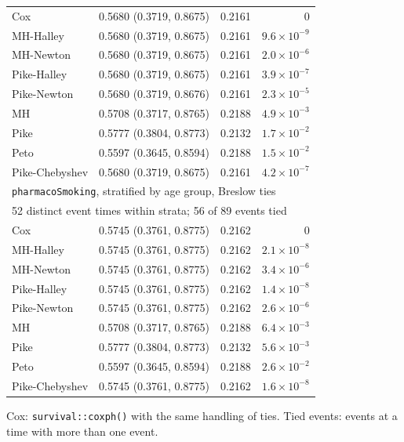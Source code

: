 \begin{longtable}{llrr}
Cox & 0.5680 (0.3719, 0.8675) & 0.2161 & $0$ \\
MH-Halley & 0.5680 (0.3719, 0.8675) & 0.2161 & $9.6 \times 10^{-9}$ \\
MH-Newton & 0.5680 (0.3719, 0.8675) & 0.2161 & $2.0 \times 10^{-6}$ \\
Pike-Halley & 0.5680 (0.3719, 0.8675) & 0.2161 & $3.9 \times 10^{-7}$ \\
Pike-Newton & 0.5680 (0.3719, 0.8676) & 0.2161 & $2.3 \times 10^{-5}$ \\
MH & 0.5708 (0.3717, 0.8765) & 0.2188 & $4.9 \times 10^{-3}$ \\
Pike & 0.5777 (0.3804, 0.8773) & 0.2132 & $1.7 \times 10^{-2}$ \\
Peto & 0.5597 (0.3645, 0.8594) & 0.2188 & $1.5 \times 10^{-2}$ \\
Pike-Chebyshev & 0.5680 (0.3719, 0.8675) & 0.2161 & $4.2 \times 10^{-7}$ \\
\multicolumn{4}{l}{\texttt{pharmacoSmoking}, stratified by age group, Breslow ties} \\
\multicolumn{4}{l}{52 distinct event times within strata; 56 of 89 events tied} \\
Cox & 0.5745 (0.3761, 0.8775) & 0.2162 & $0$ \\
MH-Halley & 0.5745 (0.3761, 0.8775) & 0.2162 & $2.1 \times 10^{-8}$ \\
MH-Newton & 0.5745 (0.3761, 0.8775) & 0.2162 & $3.4 \times 10^{-6}$ \\
Pike-Halley & 0.5745 (0.3761, 0.8775) & 0.2162 & $1.4 \times 10^{-8}$ \\
Pike-Newton & 0.5745 (0.3761, 0.8775) & 0.2162 & $2.6 \times 10^{-6}$ \\
MH & 0.5708 (0.3717, 0.8765) & 0.2188 & $6.4 \times 10^{-3}$ \\
Pike & 0.5777 (0.3804, 0.8773) & 0.2132 & $5.6 \times 10^{-3}$ \\
Peto & 0.5597 (0.3645, 0.8594) & 0.2188 & $2.6 \times 10^{-2}$ \\
Pike-Chebyshev & 0.5745 (0.3761, 0.8775) & 0.2162 & $1.6 \times 10^{-8}$ \\
\end{longtable}
Cox: \texttt{survival::coxph()} with the same handling of ties. Tied events: events at a time with more than one event.\par
\endgroup
